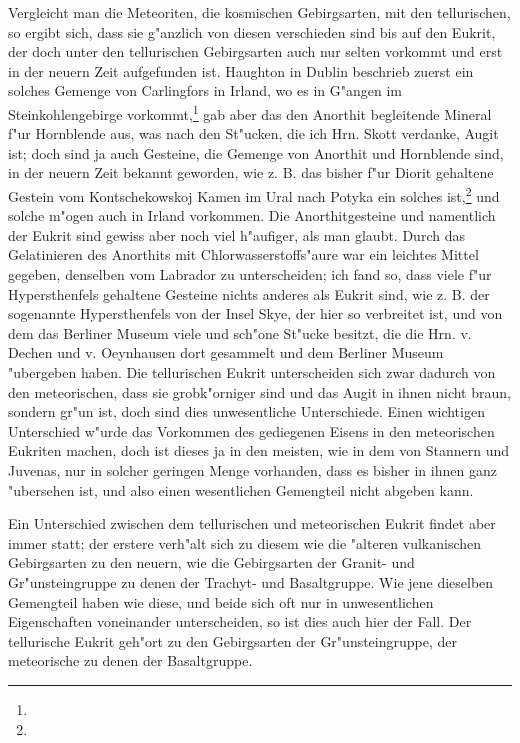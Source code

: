\documentclass[a4paper, 11pt, oneside]{article}
\begin{document}
Vergleicht man die Meteoriten, die kosmischen Gebirgsarten, mit den tellurischen, so ergibt sich, dass sie g"anzlich von diesen verschieden sind bis auf den Eukrit, der doch unter den tellurischen Gebirgsarten auch nur selten vorkommt und erst in der neuern Zeit aufgefunden ist. Haughton in Dublin beschrieb zuerst ein solches Gemenge von Carlingfors in Irland, wo es in G"angen im Steinkohlengebirge vorkommt,\footnote{} gab aber das den Anorthit begleitende Mineral f"ur Hornblende aus, was nach den St"ucken, die ich Hrn. Skott verdanke, Augit ist; doch sind ja auch Gesteine, die Gemenge von Anorthit und Hornblende sind, in der neuern Zeit bekannt geworden, wie z. B. das bisher f"ur Diorit gehaltene Gestein vom Kontschekowskoj Kamen im Ural nach Potyka ein solches ist,\footnote{} und solche m"ogen auch in Irland vorkommen. Die Anorthitgesteine und namentlich der Eukrit sind gewiss aber noch viel h"aufiger, als man glaubt. Durch das Gelatinieren des Anorthits mit Chlorwasserstoffs"aure war ein leichtes Mittel gegeben, denselben vom Labrador zu unterscheiden; ich fand so, dass viele f"ur Hypersthenfels gehaltene Gesteine nichts anderes als Eukrit sind, wie z. B. der sogenannte Hypersthenfels von der Insel Skye, der hier so verbreitet ist, und von dem das Berliner Museum viele und sch"one St"ucke besitzt, die die Hrn. v. Dechen und v. Oeynhausen dort gesammelt und dem Berliner Museum "ubergeben haben. Die tellurischen Eukrit unterscheiden sich zwar dadurch von den meteorischen, dass sie grobk"orniger sind und das Augit in ihnen nicht braun, sondern gr"un ist, doch sind dies unwesentliche Unterschiede. Einen wichtigen Unterschied w"urde das Vorkommen des gediegenen Eisens in den meteorischen Eukriten machen, doch ist dieses ja in den meisten, wie in dem von Stannern und Juvenas, nur in solcher geringen Menge vorhanden, dass es bisher in ihnen ganz "ubersehen ist, und also einen wesentlichen Gemengteil nicht abgeben kann.

Ein Unterschied zwischen dem tellurischen und meteorischen Eukrit findet aber immer statt; der erstere verh"alt sich zu diesem wie die "alteren vulkanischen Gebirgsarten zu den neuern, wie die Gebirgsarten der Granit- und Gr"unsteingruppe zu denen der Trachyt- und Basaltgruppe. Wie jene dieselben Gemengteil haben wie diese, und beide sich oft nur in unwesentlichen Eigenschaften voneinander unterscheiden, so ist dies auch hier der Fall. Der tellurische Eukrit geh"ort zu den Gebirgsarten der Gr"unsteingruppe, der meteorische zu denen der Basaltgruppe.
\end{document}
